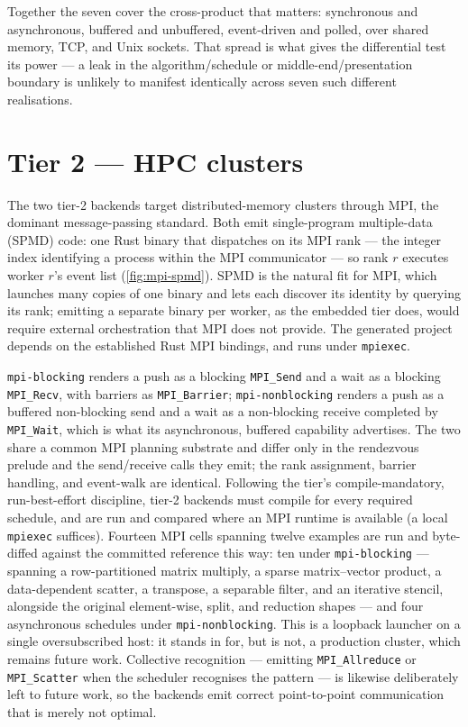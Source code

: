 Together the seven cover the cross-product that matters: synchronous and
asynchronous, buffered and unbuffered, event-driven and polled, over shared
memory, TCP, and Unix sockets. That spread is what gives the differential test its
power --- a leak in the algorithm/schedule or middle-end/presentation boundary is
unlikely to manifest identically across seven such different realisations.

\section{Tier 2 --- HPC clusters}\label{sec:be-tier2}

The two tier-2 backends target distributed-memory clusters through MPI, the
dominant message-passing standard. Both emit single-program multiple-data (SPMD)
code: one Rust binary that dispatches on its MPI rank --- the integer index
identifying a process within the MPI communicator --- so rank $r$ executes
worker $r$'s event list (\cref{fig:mpi-spmd}). SPMD is the natural fit for MPI,
which launches many copies of one binary and lets each discover its identity by
querying its rank; emitting a separate binary per worker, as the embedded tier
does, would require external orchestration that MPI does not provide. The
generated project depends on the established Rust MPI bindings, and runs under
\texttt{mpiexec}.



\texttt{mpi-blocking} renders a push as a blocking \texttt{MPI\_Send} and a wait
as a blocking \texttt{MPI\_Recv}, with barriers as \texttt{MPI\_Barrier};
\texttt{mpi-nonblocking} renders a push as a buffered non-blocking send and a wait
as a non-blocking receive completed by \texttt{MPI\_Wait}, which is what its
asynchronous, buffered capability advertises. The two share a common MPI planning
substrate and differ only in the rendezvous prelude and the send/receive calls
they emit; the rank assignment, barrier handling, and event-walk are identical.
Following the tier's compile-mandatory, run-best-effort discipline, tier-2
backends must compile for every required schedule, and are run and compared where
an MPI runtime is available (a local \texttt{mpiexec} suffices). Fourteen MPI cells
spanning twelve examples are run and byte-diffed against the committed reference
this way: ten under \texttt{mpi-blocking} --- spanning a row-partitioned matrix
multiply, a sparse matrix--vector product, a data-dependent scatter, a
transpose, a separable filter, and an iterative stencil, alongside the original element-wise, split, and
reduction shapes --- and four asynchronous schedules under \texttt{mpi-nonblocking}.
This is a loopback launcher on a single oversubscribed host: it stands in for, but
is not, a production cluster, which remains future work. Collective
recognition --- emitting \texttt{MPI\_Allreduce} or \texttt{MPI\_Scatter} when the
scheduler recognises the pattern --- is likewise deliberately left to future work, so the
backends emit correct point-to-point communication that is merely not optimal.

